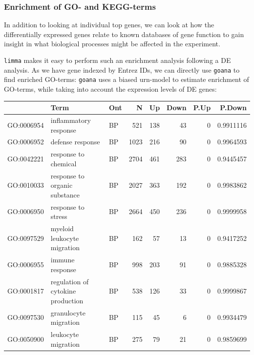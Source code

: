 \documentclass[9pt,a4paper,]{extarticle}
\newenvironment{Shaded}{\begin{snugshade}}{\end{snugshade}}
\newcommand{\KeywordTok}[1]{\textcolor[rgb]{0.13,0.29,0.53}{\textbf{{#1}}}}
\newcommand{\DataTypeTok}[1]{\textcolor[rgb]{0.13,0.29,0.53}{{#1}}}
\newcommand{\DecValTok}[1]{\textcolor[rgb]{0.00,0.00,0.81}{{#1}}}
\newcommand{\StringTok}[1]{\textcolor[rgb]{0.31,0.60,0.02}{{#1}}}
\newcommand{\CommentTok}[1]{\textcolor[rgb]{0.56,0.35,0.01}{\textit{{#1}}}}
\newcommand{\OtherTok}[1]{\textcolor[rgb]{0.56,0.35,0.01}{{#1}}}
\newcommand{\NormalTok}[1]{{#1}}
\begin{document}
\subsubsection{Enrichment of GO- and KEGG-terms}\label{enrichment-of-go--and-kegg-terms}

In addition to looking at individual top genes, we can look at how the differentially expressed genes relate to known databases of gene function to gain insight in what biological processes might be affected in the experiment.

\texttt{limma} makes it easy to perform such an enrichment analysis following a DE analysis. As we have gene indexed by Entrez IDs, we can directly use \texttt{goana} to find enriched GO-terms: \texttt{goana} uses a biased urn-model to estimate enrichment of GO-terms, while taking into account the expression levels of DE genes:

\begin{Shaded}
\end{Shaded}

\begin{tabular}{l|l|l|r|r|r|r|r}
\hline
  & Term & Ont & N & Up & Down & P.Up & P.Down\\
\hline
GO:0006954 & inflammatory response & BP & 521 & 138 & 43 & 0 & 0.9911116\\
\hline
GO:0006952 & defense response & BP & 1023 & 216 & 90 & 0 & 0.9964593\\
\hline
GO:0042221 & response to chemical & BP & 2704 & 461 & 283 & 0 & 0.9445457\\
\hline
GO:0010033 & response to organic substance & BP & 2027 & 363 & 192 & 0 & 0.9983862\\
\hline
GO:0006950 & response to stress & BP & 2664 & 450 & 236 & 0 & 0.9999958\\
\hline
GO:0097529 & myeloid leukocyte migration & BP & 162 & 57 & 13 & 0 & 0.9417252\\
\hline
GO:0006955 & immune response & BP & 998 & 203 & 91 & 0 & 0.9885328\\
\hline
GO:0001817 & regulation of cytokine production & BP & 538 & 126 & 33 & 0 & 0.9999867\\
\hline
GO:0097530 & granulocyte migration & BP & 115 & 45 & 6 & 0 & 0.9934479\\
\hline
GO:0050900 & leukocyte migration & BP & 275 & 79 & 21 & 0 & 0.9859699\\
\hline
\end{tabular}
\end{document}
